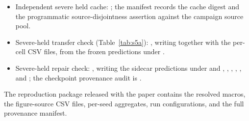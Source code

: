 \documentclass[letterpaper,onecolumn,11pt,journal]{IEEEtran}
\begin{document}
\begin{itemize}
  manifest; it is never an input feature of any model.
  \item Independent severe held cache:
  ; the manifest records the cache
  digest and the programmatic source-disjointness assertion against the
  campaign source pool.
  \item Severe-held transfer check (Table~\ref{tab:s5a}):
  , writing
   together with
  the per-cell CSV files, from the frozen predictions under
  .
  \item Severe-held repair check:
  , writing the
  sidecar predictions under
   and
  , ,
  , ,
  , and ; the
  checkpoint provenance audit is .
\end{itemize}

The reproduction package released with the paper contains the resolved macros,
the figure-source CSV files, per-seed aggregates, run configurations, and the
full provenance manifest.
\end{document}

